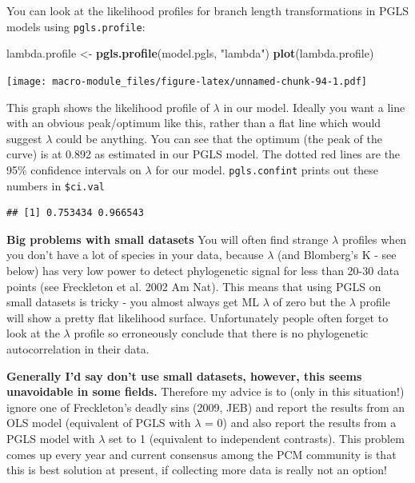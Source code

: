 \documentclass[]{book}
\newenvironment{Shaded}{\begin{snugshade}}{\end{snugshade}}
\newcommand{\KeywordTok}[1]{\textcolor[rgb]{0.13,0.29,0.53}{\textbf{{#1}}}}
\newcommand{\StringTok}[1]{\textcolor[rgb]{0.31,0.60,0.02}{{#1}}}
\newcommand{\NormalTok}[1]{{#1}}
\begin{document}
You can look at the likelihood profiles for branch length
transformations in PGLS models using \texttt{pgls.profile}:

\begin{Shaded}
\begin{Highlighting}[]
\NormalTok{lambda.profile <-}\StringTok{ }\KeywordTok{pgls.profile}\NormalTok{(model.pgls, }\StringTok{"lambda"}\NormalTok{)}
\KeywordTok{plot}\NormalTok{(lambda.profile)}
\end{Highlighting}
\end{Shaded}

\texttt{[image: macro-module\_files/figure-latex/unnamed-chunk-94-1.pdf]}

This graph shows the likelihood profile of \(\lambda\) in our model.
Ideally you want a line with an obvious peak/optimum like this, rather
than a flat line which would suggest \(\lambda\) could be anything. You
can see that the optimum (the peak of the curve) is at 0.892 as
estimated in our PGLS model. The dotted red lines are the 95\%
confidence intervals on \(\lambda\) for our model. \texttt{pgls.confint}
prints out these numbers in \texttt{\$ci.val}

\begin{Shaded}
\end{Shaded}

\begin{verbatim}
## [1] 0.753434 0.966543
\end{verbatim}

\textbf{Big problems with small datasets} You will often find strange
\(\lambda\) profiles when you don't have a lot of species in your data,
because \(\lambda\) (and Blomberg's K - see below) has very low power to
detect phylogenetic signal for less than 20-30 data points (see
Freckleton et al. 2002 Am Nat). This means that using PGLS on small
datasets is tricky - you almost always get ML \(\lambda\) of zero but
the \(\lambda\) profile will show a pretty flat likelihood surface.
Unfortunately people often forget to look at the \(\lambda\) profile so
erroneously conclude that there is no phylogenetic autocorrelation in
their data.

\textbf{Generally I'd say don't use small datasets, however, this seems
unavoidable in some fields.} Therefore my advice is to (only in this
situation!) ignore one of Freckleton's deadly sins (2009, JEB) and
report the results from an OLS model (equivalent of PGLS with
\(\lambda\) = 0) and also report the results from a PGLS model with
\(\lambda\) set to 1 (equivalent to independent contrasts). This problem
comes up every year and current consensus among the PCM community is
that this is best solution at present, if collecting more data is really
not an option!
\end{document}
